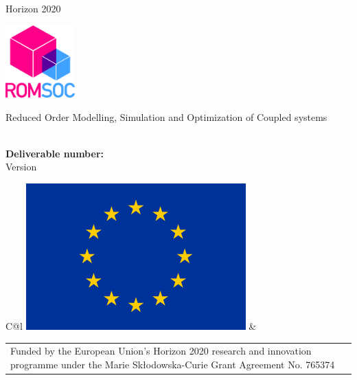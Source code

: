 \documentclass{ROMSOC}
\begin{document}
\begin{center}
Horizon 2020
\vspace{2cm}

  \begin{center}
  \includegraphics[width=0.2\textwidth]{images/ROMSOC_Logo}
  \vspace{2mm}
  \end{center}
  \vspace{1cm}
  {\Large Reduced Order Modelling, Simulation and Optimization of Coupled systems}
  \vspace{2cm}

  \begin{spacing}{2.5}
    \textbf{\Huge \DelTitle}\\\vspace{10mm}
    \textbf{\Large Deliverable number: \DelNumber} \\\vspace{10mm} 
    {\large Version \DelVersion}
  \end{spacing}
  
  \vspace*{\fill}

  \begin{tabular}{C@{\hspace*{0cm}}l}
    \includegraphics[scale=0.2]{images/logos/EU_Flag_320_213} &
    \begin{tabular}{p{12cm}}
    {Funded by the European Union’s Horizon 2020 research and innovation programme
    under the Marie Sk\l odowska-Curie Grant Agreement No. 765374}
    \end{tabular}
  \end{tabular}
\end{center}
\end{document}
